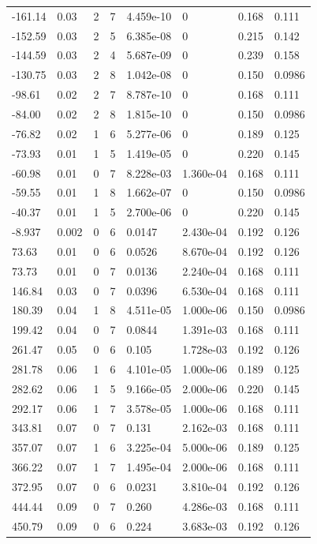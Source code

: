 \documentclass[preview]{standalone}
\begin{document}
{{\begin{tabular}{L{1.2cm}C{1.2cm} C{0.3cm}C{0.5cm} C{1.4cm}C{1.4cm} C{1.4cm}C{1.4cm}}
  -161.14  &  0.03  & 2     &  7 &  4.459e-10  & 0  & 0.168 &  0.111   \\ 
  -152.59  &  0.03  & 2     &  5 &  6.385e-08  & 0  & 0.215 &  0.142   \\ 
  -144.59  &  0.03  & 2     &  4 &  5.687e-09  & 0  & 0.239 &  0.158   \\ 
  -130.75  &  0.03  & 2     &  8 &  1.042e-08  & 0  & 0.150 &  0.0986   \\ 
  -98.61  &  0.02  & 2     &  7 &  8.787e-10  & 0  & 0.168 &  0.111   \\ 
  -84.00  &  0.02  & 2     &  8 &  1.815e-10  & 0  & 0.150 &  0.0986   \\ 
  -76.82  &  0.02  & 1     &  6 &  5.277e-06  & 0  & 0.189 &  0.125   \\ 
  -73.93  &  0.01  & 1     &  5 &  1.419e-05  & 0  & 0.220 &  0.145   \\ 
  -60.98  &  0.01  & 0     &  7 &  8.228e-03  & 1.360e-04  & 0.168 &  0.111   \\ 
  -59.55  &  0.01  & 1     &  8 &  1.662e-07  & 0  & 0.150 &  0.0986   \\ 
  -40.37  &  0.01  & 1     &  5 &  2.700e-06  & 0  & 0.220 &  0.145   \\ 
  -8.937  &  0.002  & 0     &  6 &  0.0147  & 2.430e-04  & 0.192 &  0.126   \\ 
  73.63  &  0.01  & 0     &  6 &  0.0526  & 8.670e-04  & 0.192 &  0.126   \\ 
  73.73  &  0.01  & 0     &  7 &  0.0136  & 2.240e-04  & 0.168 &  0.111   \\ 
  146.84  &  0.03  & 0     &  7 &  0.0396  & 6.530e-04  & 0.168 &  0.111   \\ 
  180.39  &  0.04  & 1     &  8 &  4.511e-05  & 1.000e-06  & 0.150 &  0.0986   \\ 
  199.42  &  0.04  & 0     &  7 &  0.0844  & 1.391e-03  & 0.168 &  0.111   \\ 
  261.47  &  0.05  & 0     &  6 &  0.105  & 1.728e-03  & 0.192 &  0.126   \\ 
  281.78  &  0.06  & 1     &  6 &  4.101e-05  & 1.000e-06  & 0.189 &  0.125   \\ 
  282.62  &  0.06  & 1     &  5 &  9.166e-05  & 2.000e-06  & 0.220 &  0.145   \\ 
  292.17  &  0.06  & 1     &  7 &  3.578e-05  & 1.000e-06  & 0.168 &  0.111   \\ 
  343.81  &  0.07  & 0     &  7 &  0.131  & 2.162e-03  & 0.168 &  0.111   \\ 
  357.07  &  0.07  & 1     &  6 &  3.225e-04  & 5.000e-06  & 0.189 &  0.125   \\ 
  366.22  &  0.07  & 1     &  7 &  1.495e-04  & 2.000e-06  & 0.168 &  0.111   \\ 
  372.95  &  0.07  & 0     &  6 &  0.0231  & 3.810e-04  & 0.192 &  0.126   \\ 
  444.44  &  0.09  & 0     &  7 &  0.260  & 4.286e-03  & 0.168 &  0.111   \\ 
  450.79  &  0.09  & 0     &  6 &  0.224  & 3.683e-03  & 0.192 &  0.126   \\ 
\hline 
\end{tabular} 

}}
\end{document}

